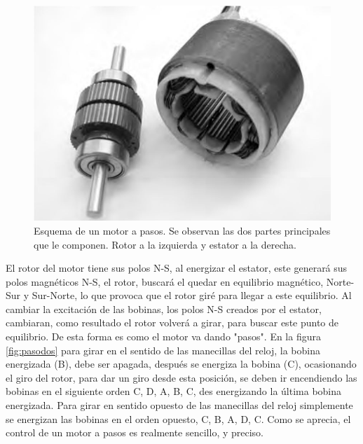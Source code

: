 \begin{figure}[h]
	\centering
	\includegraphics[width=0.7\linewidth]{Imagenes/2/RotorEstator}
	\caption{Esquema de un motor a pasos. Se observan las dos partes principales que le componen. Rotor a la izquierda y estator a la derecha. \cite{Acarnley2002}}
	\label{fig:rotorestator}
\end{figure}
El rotor del motor tiene sus polos N-S, al energizar el estator, este generará sus polos magnéticos N-S, el rotor, buscará el quedar en equilibrio magnético, Norte-Sur y Sur-Norte, lo que provoca que el rotor giré para llegar a este equilibrio. Al cambiar la excitación de las bobinas, los polos N-S creados por el estator, cambiaran, como resultado el rotor volverá a girar, para buscar este punto de equilibrio. De esta forma es como el motor va dando "pasos". En la figura \ref{fig:pasodos} para girar en el sentido de las manecillas del reloj, la bobina energizada (B), debe ser apagada, después se energiza la bobina (C), ocasionando el giro del rotor, para dar un giro desde esta posición, se deben ir encendiendo las bobinas en el siguiente orden C, D, A, B, C, des energizando la última bobina energizada. Para girar en sentido opuesto de las manecillas del reloj simplemente se energizan las bobinas en el orden opuesto, C, B, A, D, C.
Como se aprecia, el control de un motor a pasos es realmente sencillo, y preciso. 

